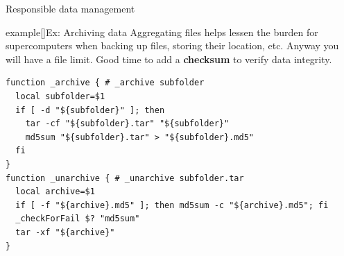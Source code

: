 \begin{frame}[fragile]{Responsible data management}
\vspace{-2mm}
\begin{varblock}{example}[\textwidth]{Ex: Archiving data}
Aggregating files helps lessen the burden for supercomputers when backing up
files, storing their location, etc. Anyway you will have a file limit. Good time
to add a \textbf{checksum} to verify data integrity.
\begin{lstlisting}[style=MyBash, aboveskip=3mm, belowskip=-8mm]
function _archive { # _archive subfolder
  local subfolder=$1
  if [ -d "${subfolder}" ]; then
    tar -cf "${subfolder}.tar" "${subfolder}"
    md5sum "${subfolder}.tar" > "${subfolder}.md5"
  fi
}
function _unarchive { # _unarchive subfolder.tar
  local archive=$1
  if [ -f "${archive}.md5" ]; then md5sum -c "${archive}.md5"; fi
  _checkForFail $? "md5sum"
  tar -xf "${archive}"
}
\end{lstlisting}
\end{varblock}
\end{frame}


